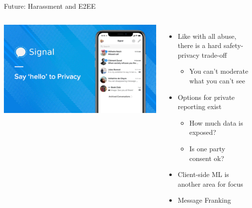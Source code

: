 \documentclass[nobackground,dvipsnames,table]{beamer}
\begin{document}
\begin{frame}{Future: Harassment and E2EE}
    \begin{columns}
            \includegraphics[width=\textwidth]{signal}
            \begin{itemize}
                \item Like with all abuse, there is a hard safety-privacy trade-off
                \begin{itemize}
                    \item You can’t moderate what you can’t see
                \end{itemize}
                \item Options for private reporting exist
                \begin{itemize}
                    \item How much data is exposed?
                    \item Is one party consent ok?
                \end{itemize}
                \item Client-side ML is another area for focus
                \item Message Franking
            \end{itemize}
    \end{columns}
\end{frame}
\end{document}
